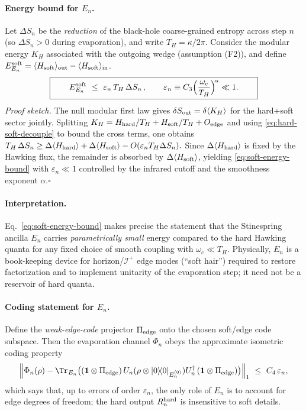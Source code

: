 \paragraph{Energy bound for $E_n$.}
Let $\Delta S_n$ be the \emph{reduction} of the black-hole coarse-grained entropy across step $n$ (so $\Delta S_n>0$ during evaporation), and write $T_H=\kappa/2\pi$. Consider the modular energy $K_H$ associated with the outgoing wedge (assumption (F2)), and define $E^{\rm soft}_{E_n}=\langle H_{\rm soft}\rangle_{\rm out}-\langle H_{\rm soft}\rangle_{\rm in}$.
\begin{equation}
  \boxed{\qquad
  E^{\rm soft}_{E_n}\ \le\ \varepsilon_n\, T_H\, \Delta S_n\,,\qquad \varepsilon_n\equiv C_3\Big(\frac{\omega_c}{T_H}\Big)^{\!\alpha}\ll 1.
  \qquad}
  \label{eq:soft-energy-bound}
\end{equation}
\emph{Proof sketch.} The null modular first law gives $\delta S_{\rm out}=\delta\langle K_H\rangle$ for the hard$+$soft sector jointly. Splitting $K_H=H_{\rm hard}/T_H + H_{\rm soft}/T_H + O_{\rm edge}$ and using \eqref{eq:hard-soft-decouple} to bound the cross terms, one obtains
$
T_H\,\Delta S_n
 \ge \Delta \langle H_{\rm hard}\rangle + \Delta \langle H_{\rm soft}\rangle - O(\varepsilon_n T_H \Delta S_n).
$
Since $\Delta \langle H_{\rm hard}\rangle$ is fixed by the Hawking flux, the remainder is absorbed by $\Delta \langle H_{\rm soft}\rangle$, yielding \eqref{eq:soft-energy-bound} with $\varepsilon_n\!\ll\!1$ controlled by the infrared cutoff and the smoothness exponent $\alpha$.\hfill$\square$

\paragraph{Interpretation.}
Eq.~\eqref{eq:soft-energy-bound} makes precise the statement that the Stinespring ancilla $E_n$ carries \emph{parametrically small} energy compared to the hard Hawking quanta for any fixed choice of smooth coupling with $\omega_c\ll T_H$. Physically, $E_n$ is a book-keeping device for horizon/$\mathscr{I}^+$ edge modes (``soft hair'') required to restore factorization and to implement unitarity of the evaporation step; it need not be a reservoir of hard quanta.

\paragraph{Coding statement for $E_n$.}
Define the \emph{weak-edge-code} projector $\Pi_{\rm edge}$ onto the chosen soft/edge code subspace. Then the evaporation channel $\Phi_n$ obeys the approximate isometric coding property
\begin{equation}
  \left\| \Phi_n(\rho) - \Tr_{E_n}\big( (\mathbf{1}\otimes \Pi_{\rm edge})\, U_n (\rho\otimes |0\rangle\!\langle 0|_{E_n^{(0)}}) U_n^\dagger\, (\mathbf{1}\otimes \Pi_{\rm edge}) \big) \right\|_1
  \ \le\ C_4\,\varepsilon_n,
  \label{eq:edge-coding}
\end{equation}
which says that, up to errors of order $\varepsilon_n$, the only role of $E_n$ is to account for edge degrees of freedom; the hard output $R_n^{\rm hard}$ is insensitive to soft details.

